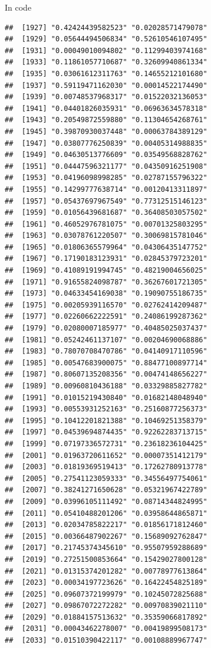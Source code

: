 \documentclass[ignorenonframetext,]{beamer}
\begin{document}
\begin{frame}[fragile]{In code}
\begin{verbatim}
##  [1927] "0.42424439582523" "0.02028571479078"
##  [1929] "0.05644494506834" "0.52610546107495"
##  [1931] "0.00049010094802" "0.11299403974168"
##  [1933] "0.11861057710687" "0.32609940861334"
##  [1935] "0.03061612311763" "0.14655212101680"
##  [1937] "0.59119471162030" "0.00014522174490"
##  [1939] "0.00748537968317" "0.01522032136053"
##  [1941] "0.04401826035931" "0.06963634578318"
##  [1943] "0.20549872559880" "0.11304654268761"
##  [1945] "0.39870930037448" "0.00063784389129"
##  [1947] "0.03807776250839" "0.00405314988835"
##  [1949] "0.04630513776609" "0.03549568828762"
##  [1951] "0.04447596321177" "0.04350916251908"
##  [1953] "0.04196098998285" "0.02787155796322"
##  [1955] "0.14299777638714" "0.00120413311897"
##  [1957] "0.05437697967549" "0.77312515146123"
##  [1959] "0.01056439681687" "0.36408503057502"
##  [1961] "0.46052976781075" "0.00701325803295"
##  [1963] "0.03078761220507" "0.30069815781046"
##  [1965] "0.01806365579964" "0.04306435147752"
##  [1967] "0.17190183123931" "0.02845379723201"
##  [1969] "0.41089191994745" "0.48219004656025"
##  [1971] "0.91655824098787" "0.36267601721305"
##  [1973] "0.04633454169038" "0.19090755186735"
##  [1975] "0.00205939116570" "0.02762414209487"
##  [1977] "0.02260662222591" "0.24086199287362"
##  [1979] "0.02080007185977" "0.40485025037437"
##  [1981] "0.05242461137107" "0.00204690068886"
##  [1983] "0.78070708470786" "0.04140917110596"
##  [1985] "0.00547683900075" "0.88477100897714"
##  [1987] "0.80607135208356" "0.00474148656227"
##  [1989] "0.00960810436188" "0.03329885827782"
##  [1991] "0.01015219430840" "0.01682148048940"
##  [1993] "0.00553931252163" "0.25160877256373"
##  [1995] "0.10412201821388" "0.10469251358379"
##  [1997] "0.04539694874435" "0.92262283713715"
##  [1999] "0.07197336572731" "0.23618236104425"
##  [2001] "0.01963720611652" "0.00007351412179"
##  [2003] "0.01819369519413" "0.17262780913778"
##  [2005] "0.27541123059333" "0.34556497754061"
##  [2007] "0.38241271650628" "0.05321967422789"
##  [2009] "0.03996105111492" "0.08714344824995"
##  [2011] "0.05410488201206" "0.03958644865871"
##  [2013] "0.02034785822217" "0.01856171812460"
##  [2015] "0.00366487902267" "0.15689092762847"
##  [2017] "0.21745374345610" "0.95507959288689"
##  [2019] "0.27251500853664" "0.15429027800128"
##  [2021] "0.01315374201282" "0.00778977613864"
##  [2023] "0.00034197723626" "0.16422454825189"
##  [2025] "0.09607372199979" "0.10245072825688"
##  [2027] "0.09867072272282" "0.00970839021110"
##  [2029] "0.01884157513632" "0.35359066817892"
##  [2031] "0.00043462278007" "0.00419899508173"
##  [2033] "0.01510390422117" "0.00108889967747"

\end{verbatim}
\end{frame}
\end{document}
